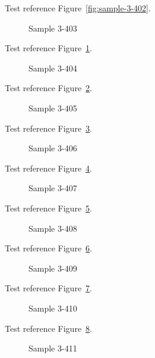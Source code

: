 Test reference Figure~\ref{fig:sample-3-402}.

\begin{figure}[tbhp]
\caption{Sample 3-403}
\label{fig:sample-3-403}
\end{figure}

Test reference Figure~\ref{fig:sample-3-403}.

\begin{figure}[tbhp]
\caption{Sample 3-404}
\label{fig:sample-3-404}
\end{figure}

Test reference Figure~\ref{fig:sample-3-404}.

\begin{figure}[tbhp]
\caption{Sample 3-405}
\label{fig:sample-3-405}
\end{figure}

Test reference Figure~\ref{fig:sample-3-405}.

\begin{figure}[tbhp]
\caption{Sample 3-406}
\label{fig:sample-3-406}
\end{figure}

Test reference Figure~\ref{fig:sample-3-406}.

\begin{figure}[tbhp]
\caption{Sample 3-407}
\label{fig:sample-3-407}
\end{figure}

Test reference Figure~\ref{fig:sample-3-407}.

\begin{figure}[tbhp]
\caption{Sample 3-408}
\label{fig:sample-3-408}
\end{figure}

Test reference Figure~\ref{fig:sample-3-408}.

\begin{figure}[tbhp]
\caption{Sample 3-409}
\label{fig:sample-3-409}
\end{figure}

Test reference Figure~\ref{fig:sample-3-409}.

\begin{figure}[tbhp]
\caption{Sample 3-410}
\label{fig:sample-3-410}
\end{figure}

Test reference Figure~\ref{fig:sample-3-410}.

\begin{figure}[tbhp]
\caption{Sample 3-411}
\label{fig:sample-3-411}
\end{figure}

